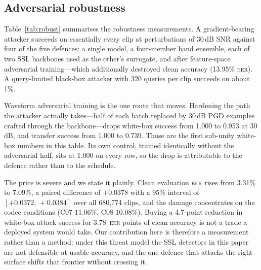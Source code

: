 \documentclass[11pt,a4paper]{article}
\newcommand{\eer}{\textsc{eer}}
\begin{document}
\subsection{Adversarial robustness}
\label{sec:robust}

\begin{table}[t]
\centering
\small
\caption{Attack success at a 0.1\% false-alarm operating point, 20-step PGD under an SNR-constrained
$L_2$ budget; realised SNR is reported, not assumed. Generated directly from the attack logs, so
the table cannot drift from the measurements. Four routes are closed outright; waveform
adversarial training is the only one that moves white-box success off 1.000.}
\label{tab:robust}

\end{table}

Table~\ref{tab:robust} summarises the robustness measurements. A gradient-bearing attacker succeeds
on essentially every clip at perturbations of 30\,dB SNR against four of the five defences: a single
model, a four-member band ensemble, each of two SSL backbones used as the other's surrogate, and
after feature-space adversarial training---which additionally destroyed clean accuracy (13.95\%
\eer{}). A query-limited black-box attacker with 320 queries per clip succeeds on about 1\%.

Waveform adversarial training is the one route that moves. Hardening the path the attacker actually
takes---half of each batch replaced by 30\,dB PGD examples crafted through the backbone---drops
white-box success from 1.000 to 0.953 at 30\,dB, and transfer success from 1.000 to 0.739. Those are
the first sub-unity white-box numbers in this table. Its own control, trained identically without
the adversarial half, sits at 1.000 on every row, so the drop is attributable to the defence rather
than to the schedule.

The price is severe and we state it plainly. Clean evaluation \eer{} rises from 3.31\% to 7.09\%, a
paired difference of $+0.0378$ with a 95\% interval of $[+0.0372,\,+0.0384]$ over all 680{,}774
clips, and the damage concentrates on the codec conditions (C07 11.06\%, C08 10.08\%). Buying a
4.7-point reduction in white-box attack success for 3.78~\eer{} points of clean accuracy is not a
trade a deployed system would take. Our contribution here is therefore a measurement rather than a
method: under this threat model the SSL detectors in this paper are not defensible at usable
accuracy, and the one defence that attacks the right surface shifts that frontier without crossing
it.
\end{document}
